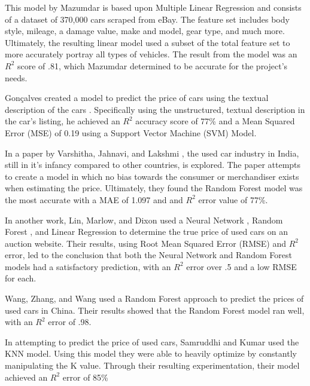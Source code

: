 \documentclass[compsoc]{IEEEtran}
\begin{document}
This model by Mazumdar \cite{article:relatedwork4} is based upon Multiple Linear Regression \cite{model:multiple_linear_regression} and consists of a dataset of 370,000 cars scraped from eBay. The feature set includes body style, mileage, a damage value, make and model, gear type, and much more. Ultimately, the resulting linear model used a subset of the total feature set to more accurately portray all types of vehicles. The result from the model was an $R^2$ score of .81, which Mazumdar determined to be accurate for the project's needs.

Gon{\c{c}}alves created a model to predict the price of cars using the textual description of the cars \cite{article:relatedwork5}. Specifically using the unstructured, textual description in the car's listing, he achieved an $R^2$ accuracy score of 77\% and a Mean Squared Error (MSE) of 0.19 using a Support Vector Machine (SVM) \cite{model:svm} Model.

In a paper by Varshitha, Jahnavi, and Lakshmi \cite{article:relatedwork6}, the used car industry in India, still in it's infancy compared to other countries, is explored. The paper attempts to create a model in which no bias towards the consumer or merchandiser exists when estimating the price. Ultimately, they found the Random Forest model \cite{model:random_forest} was the most accurate with a MAE of 1.097 and and $R^2$ error value of 77\%.

In another work, Lin, Marlow, and Dixon \cite{article:relatedwork7} used a Neural Network \cite{model:neural_network}, Random Forest \cite{model:random_forest}, and Linear Regression \cite{model:multiple_linear_regression} to determine the true price of used cars on an auction website. Their results, using Root Mean Squared Error (RMSE) and $R^2$ error, led to the conclusion that both the Neural Network and Random Forest models had a satisfactory prediction, with an $R^2$ error over .5 and a low RMSE for each.

Wang, Zhang, and Wang \cite{article:relatedwork8} used a Random Forest \cite{model:random_forest} approach to predict the prices of used cars in China. Their results showed that the Random Forest model ran well, with an $R^2$ error of .98.

In attempting to predict the price of used cars, Samruddhi and Kumar \cite{article:relatedwork9} used the KNN \cite{model:k_nearest_neighbors} model. Using this model they were able to heavily optimize by constantly manipulating the K value. Through their resulting experimentation, their model achieved an $R^2$ error of 85\%
\end{document}
